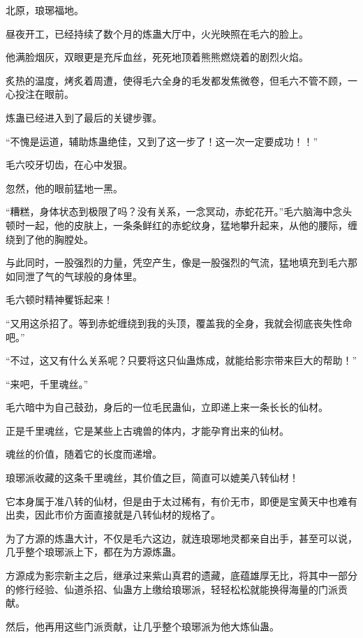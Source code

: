 
\begin{this_body}

北原，琅琊福地。

昼夜开工，已经持续了数个月的炼蛊大厅中，火光映照在毛六的脸上。

他满脸烟灰，双眼更是充斥血丝，死死地顶着熊熊燃烧着的剧烈火焰。

炙热的温度，烤炙着周遭，使得毛六全身的毛发都发焦微卷，但毛六不管不顾，一心投注在眼前。

炼蛊已经进入到了最后的关键步骤。

“不愧是运道，辅助炼蛊绝佳，又到了这一步了！这一次一定要成功！！”

毛六咬牙切齿，在心中发狠。

忽然，他的眼前猛地一黑。

“糟糕，身体状态到极限了吗？没有关系，一念冥动，赤蛇花开。”毛六脑海中念头顿时一起，他的皮肤上，一条条鲜红的赤蛇纹身，猛地攀升起来，从他的腰际，缠绕到了他的胸膛处。

与此同时，一股强烈的力量，凭空产生，像是一股强烈的气流，猛地填充到毛六那如同泄了气的气球般的身体里。

毛六顿时精神矍铄起来！

“又用这杀招了。等到赤蛇缠绕到我的头顶，覆盖我的全身，我就会彻底丧失性命吧。”

“不过，这又有什么关系呢？只要将这只仙蛊炼成，就能给影宗带来巨大的帮助！”

“来吧，千里魂丝。”

毛六暗中为自己鼓劲，身后的一位毛民蛊仙，立即递上来一条长长的仙材。

正是千里魂丝，它是某些上古魂兽的体内，才能孕育出来的仙材。

魂丝的价值，随着它的长度而递增。

琅琊派收藏的这条千里魂丝，其价值之巨，简直可以媲美八转仙材！

它本身属于准八转的仙材，但是由于太过稀有，有价无市，即便是宝黄天中也难有出卖，因此市价方面直接就是八转仙材的规格了。

为了方源的炼蛊大计，不仅是毛六这边，就连琅琊地灵都亲自出手，甚至可以说，几乎整个琅琊派上下，都在为方源炼蛊。

方源成为影宗新主之后，继承过来紫山真君的遗藏，底蕴雄厚无比，将其中一部分的修行经验、仙道杀招、仙蛊方上缴给琅琊派，轻轻松松就能换得海量的门派贡献。

然后，他再用这些门派贡献，让几乎整个琅琊派为他大炼仙蛊。


\end{this_body}
